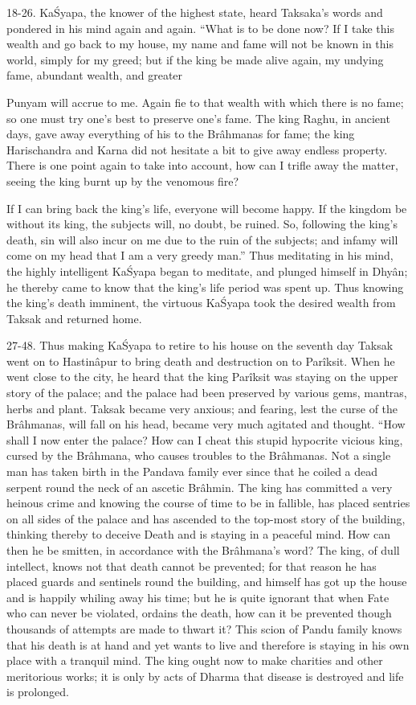 18-26. Ka\'Syapa, the knower of the highest state, heard Taksaka's words and pondered in his mind again and again. ``What is to be done now? If I take this wealth and go back to my house, my name and fame will not be known in this world, simply for my greed; but if the king be made alive again, my undying fame, abundant wealth, and greater

Punyam will accrue to me. Again fie to that wealth with which there is no fame; so one must try one's best to preserve one's fame. The king Raghu, in ancient days, gave away everything of his to the Br\^ahmanas for fame; the king Harischandra and Karna did not hesitate a bit to give away endless property. There is one point again to take into account, how can I trifle away the matter, seeing the king burnt up by the venomous fire?

If I can bring back the king's life, everyone will become happy. If the kingdom be without its king, the subjects will, no doubt, be ruined. So, following the king's death, sin will also incur on me due to the ruin of the subjects; and infamy will come on my head that I am a very greedy man.'' Thus meditating in his mind, the highly intelligent Ka\'Syapa began to meditate, and plunged himself in Dhy\^an; he thereby came to know that the king's life period was spent up. Thus knowing the king's death imminent, the virtuous Ka\'Syapa took the desired wealth from Taksak and returned home.

27-48. Thus making Ka\'Syapa to retire to his house on the seventh day Taksak went on to Hastin\^apur to bring death and destruction on to Par\^iksit. When he went close to the city, he heard that the king Par\^iksit was staying on the upper story of the palace; and the palace had been preserved by various gems, mantras, herbs and plant. Taksak became very anxious; and fearing, lest the curse of the Br\^ahmanas, will fall on his head, became very much agitated and thought. ``How shall I now enter the palace? How can I cheat this stupid hypocrite vicious king, cursed by the Br\^ahmana, who causes troubles to the Br\^ahmanas. Not a single man has taken birth in the Pandava family ever since that he coiled a dead serpent round the neck of an ascetic Br\^ahmin. The king has committed a very heinous crime and knowing the course of time to be in fallible, has placed sentries on all sides of the palace and has ascended to the top-most story of the building, thinking thereby to deceive Death and is staying in a peaceful mind. How can then he be smitten, in accordance with the Br\^ahmana's word? The king, of dull intellect, knows not that death cannot be prevented; for that reason he has placed guards and sentinels round the building, and himself has got up the house and is happily whiling away his time; but he is quite ignorant that when Fate who can never be violated, ordains the death, how can it be prevented though thousands of attempts are made to thwart it? This scion  of Pandu family knows that his death is at hand and yet wants to live and therefore is staying in his own place with a tranquil mind. The king ought now to make charities and other meritorious works; it is only by acts of Dharma that disease is destroyed and life is prolonged.


